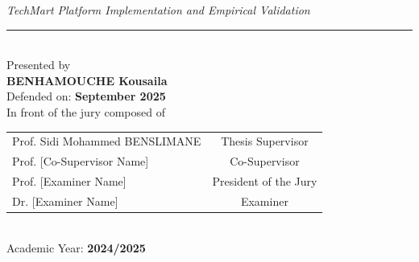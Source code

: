 \begin{center}
{\normalsize \textit{TechMart Platform Implementation and Empirical Validation}} \\[0.5cm]

\rule{14cm}{0.5pt} \\[0.7cm]

{\normalsize Presented by} \\[0.3cm]
{\large \textbf{BENHAMOUCHE Kousaila}} \\[0.6cm]

{\normalsize Defended on: \textbf{September 2025}} \\[0.3cm]
{\normalsize In front of the jury composed of} \\[0.5cm]

{\normalsize
\begin{tabular}{lc}
Prof. Sidi Mohammed BENSLIMANE & Thesis Supervisor \\[0.3cm]
Prof. [Co-Supervisor Name] & Co-Supervisor \\[0.3cm]
Prof. [Examiner Name] & President of the Jury \\[0.3cm]
Dr. [Examiner Name] & Examiner \\
\end{tabular}} \\[0.8cm]

{\normalsize Academic Year: \textbf{2024/2025}}

\end{center}

\restoregeometry
\newpage